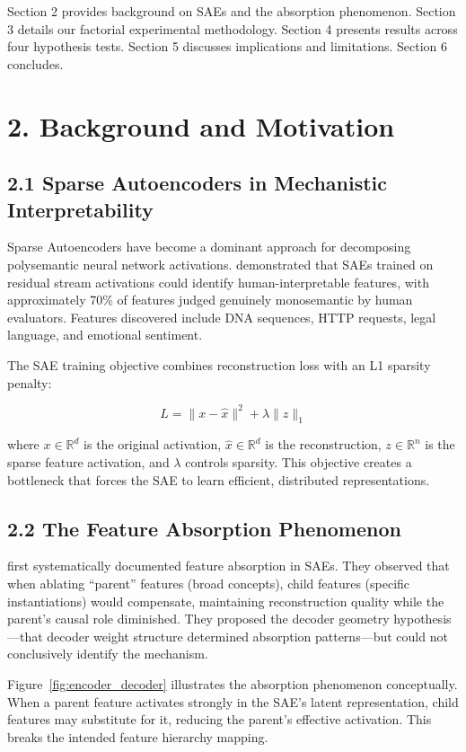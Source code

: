 \documentclass{article}
\begin{document}
Section 2 provides background on SAEs and the absorption phenomenon. Section 3 details our factorial experimental methodology. Section 4 presents results across four hypothesis tests. Section 5 discusses implications and limitations. Section 6 concludes.

\section{2. Background and Motivation}

\subsection{2.1 Sparse Autoencoders in Mechanistic Interpretability}

Sparse Autoencoders have become a dominant approach for decomposing polysemantic neural network activations. \citet{bricken2023towards} demonstrated that SAEs trained on residual stream activations could identify human-interpretable features, with approximately 70\% of features judged genuinely monosemantic by human evaluators. Features discovered include DNA sequences, HTTP requests, legal language, and emotional sentiment.

The SAE training objective combines reconstruction loss with an L1 sparsity penalty:

$$L = \|x - \hat{x}\|^2 + \lambda \|z\|_1$$

where $x \in \mathbb{R}^d$ is the original activation, $\hat{x} \in \mathbb{R}^d$ is the reconstruction, $z \in \mathbb{R}^n$ is the sparse feature activation, and $\lambda$ controls sparsity. This objective creates a bottleneck that forces the SAE to learn efficient, distributed representations.

\subsection{2.2 The Feature Absorption Phenomenon}

\citet{chanin2024absorption} first systematically documented feature absorption in SAEs. They observed that when ablating ``parent'' features (broad concepts), child features (specific instantiations) would compensate, maintaining reconstruction quality while the parent's causal role diminished. They proposed the decoder geometry hypothesis---that decoder weight structure determined absorption patterns---but could not conclusively identify the mechanism.

Figure~\ref{fig:encoder_decoder} illustrates the absorption phenomenon conceptually. When a parent feature activates strongly in the SAE's latent representation, child features may substitute for it, reducing the parent's effective activation. This breaks the intended feature hierarchy mapping.
\end{document}
